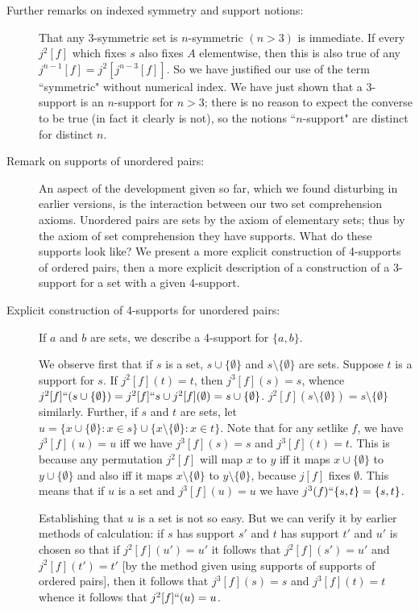 \documentclass[12pt]{article}
\begin{document}
\begin{description}
\item[Further remarks on indexed symmetry and support notions:]  That any 3-symmetric set is $n$-symmetric $(n>3)$ is immediate.  If every $j^2[f]$ which fixes $s$ also fixes $A$ elementwise,
then this is also true of any $j^{n-1}[f] = j^2[j^{n-3}[f]]$.   So we have justified our use of the term ``symmetric" without numerical index.   We have just shown that a 3-support is an $n$-support for $n>3$;  there is no reason to expect the converse to be true (in fact it clearly is not), so the notions ``$n$-support" are distinct for distinct $n$.

\item[Remark on supports of unordered pairs:]  An aspect of the development given so far, which we found disturbing in earlier versions, is the interaction between our two set comprehension axioms.  Unordered pairs are sets by the axiom of elementary sets;  thus by the axiom of set comprehension they have supports.
What do these supports look like?  We present a more explicit construction of 4-supports of ordered pairs, then a more explicit description of a construction of a 3-support for a set with a given 4-support.

\item[Explicit construction of 4-supports for unordered pairs:]  If $a$ and $b$ are sets, we describe a 4-support for $\{a,b\}$.

We observe first that if $s$ is a set, $s \cup \{\emptyset\}$ and $s \setminus \{\emptyset\}$ are sets.  Suppose $t$ is a support for $s$.  If $j^2[f](t)=t$, then $j^3[f](s)=s$, whence $j^2[f]``(s \cup \{\emptyset\}) = j^2[f]``s \cup j^2[f](\emptyset) = s \cup \{\emptyset\}$.  $j^2[f](s \setminus \{\emptyset\}) = s \setminus\{\emptyset\}$ similarly.
Further, if $s$ and $t$ are sets, let $u = \{x \cup \{\emptyset\}:x \in s\} \cup \{x \setminus \{\emptyset\}:x \in t\}$.  Note that for any setlike $f$, we have $j^3[f](u)=u$ iff we have  $j^3[f](s)=s$ and $j^3[f](t)=t$.  This is because any permutation $j^2[f]$ will map $x$ to $y$ iff it maps $x \cup \{\emptyset\}$ to $y \cup \{\emptyset\}$ and also iff it maps $x \setminus \{\emptyset\}$ to $y \setminus \{\emptyset\}$, because $j[f]$ fixes $\emptyset$.
This means that if $u$ is a set and $j^3[f](u)=u$ we have $j^3(f)``\{s,t\} = \{s,t\}$.

Establishing that $u$ is a set is not so easy.  But we can verify it by earlier methods of calculation:  if $s$ has support $s'$ and $t$ has support $t'$ and $u'$ is chosen so that if $j^2[f](u') = u'$ it follows that $j^2[f](s') = u'$  and $j^2[f](t') = t'$ [by the method given using supports of supports of ordered pairs], then it follows that $j^3[f](s)=s$ and $j^3[f](t)=t$ whence it follows that $j^2[f]``(u)=u$.


\end{description}
\end{document}
